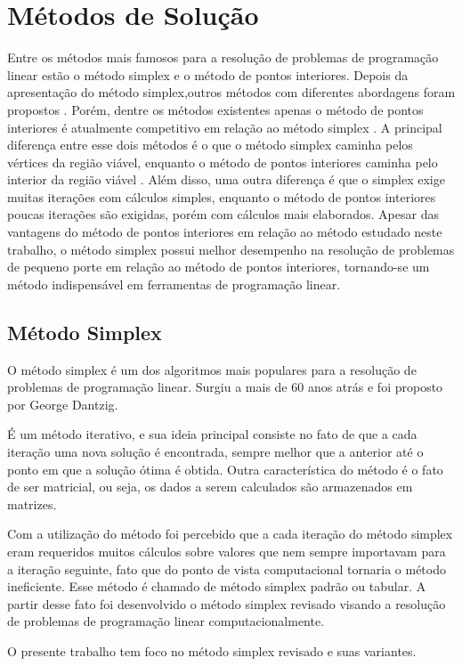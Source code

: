 \section{Métodos de Solução}
Entre os métodos mais famosos para a resolução de problemas de programação linear estão o método simplex  e o método de pontos interiores. 
Depois da apresentação do método simplex,outros métodos com diferentes abordagens foram propostos \cite{Todd}. Porém, dentre os métodos existentes apenas o método de pontos interiores é atualmente competitivo em relação ao método simplex . 
A principal diferença entre esse dois métodos é o que o método simplex caminha pelos vértices da região viável, enquanto o método de pontos interiores caminha pelo interior da região viável \cite{MaculanPI}. Além disso, uma outra diferença é que o simplex exige muitas iterações com cálculos simples, enquanto o método de pontos interiores poucas iterações são exigidas, porém com cálculos mais elaborados.
Apesar das vantagens do método de pontos interiores em relação ao método estudado neste trabalho, o método simplex possui melhor desempenho na resolução de problemas de pequeno porte em relação ao método de pontos interiores, tornando-se um método indispensável em ferramentas de programação linear.

\subsection{Método Simplex}
O método simplex é um dos algoritmos mais populares para a resolução de problemas de programação linear. Surgiu a mais de 60 anos atrás e foi proposto por George Dantzig.  

É um método iterativo, e sua ideia principal consiste no fato de que a cada iteração uma nova solução é encontrada, sempre melhor que a anterior até o ponto em que a solução ótima é obtida. Outra característica do método é o fato de ser matricial, ou seja, os dados a serem calculados são armazenados em matrizes.  

Com a utilização do método foi percebido que a cada iteração do método simplex eram requeridos muitos cálculos sobre valores que nem sempre importavam para a iteração seguinte, fato que do ponto de vista computacional tornaria o método ineficiente. Esse método é chamado de método simplex padrão ou tabular. A partir desse fato foi desenvolvido o método simplex revisado visando a resolução de problemas de programação linear computacionalmente.

O presente trabalho tem foco no método simplex revisado e suas variantes.


